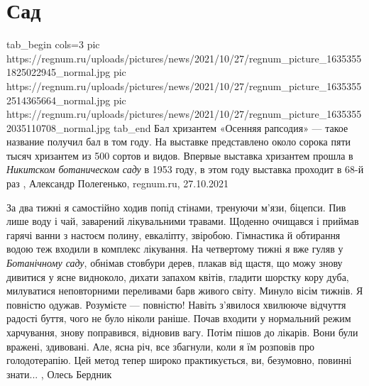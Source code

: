  
 
 
 
 
\chapter{Сад}

\ifcmt
  tab_begin cols=3
     pic https://regnum.ru/uploads/pictures/news/2021/10/27/regnum_picture_16353551825022945_normal.jpg
     pic https://regnum.ru/uploads/pictures/news/2021/10/27/regnum_picture_16353552514365664_normal.jpg
		 pic https://regnum.ru/uploads/pictures/news/2021/10/27/regnum_picture_16353552035110708_normal.jpg
  tab_end
\fi
Бал хризантем «Осенняя рапсодия» — такое название получил бал в том году. На
выставке представлено около сорока пяти тысяч хризантем из 500 сортов и видов.
Впервые выставка хризантем прошла в \emph{Никитском ботаническом саду} в 1953 году, в
этом году выставка проходит в 68-й раз
, 
Александр Полегенько, regnum.ru, 27.10.2021


За два тижні я самостійно ходив попід стінами, тренуючи м’язи, біцепси. Пив
лише воду і чай, заварений лікувальними травами. Щоденно очищався і приймав
гарячі ванни з настоєм полину, евкаліпту, звіробою. Гімнастика й обтирання
водою теж входили в комплекс лікування.  На четвертому тижні я вже гуляв у
\emph{Ботанічному саду}, обнімав стовбури дерев, плакав від щастя, що можу
знову дивитися у ясне видноколо, дихати запахом квітів, гладити шорстку кору
дуба, милуватися неповторними переливами барв живого світу.  Минуло вісім
тижнів. Я повністю одужав. Розумієте — повністю! Навіть з’явилося хвилююче
відчуття радості буття, чого не було ніколи раніше. Почав входити у нормальний
режим харчування, знову поправився, відновив вагу. Потім пішов до лікарів. Вони
були вражені, здивовані. Але, ясна річ, все збагнули, коли я їм розповів про
голодотерапію. Цей метод тепер широко практикується, ви, безумовно, повинні
знати...
, Олесь Бердник
